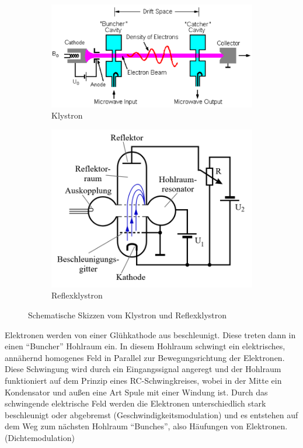 \begin{figure}
    \centering
    \begin{subfigure}{0.45\textwidth}
        \centering
        \includegraphics[width=\textwidth]{images/klystron.png}
        \caption{Klystron}
        \label{fig:klystron}
    \end{subfigure}
    \begin{subfigure}{0.45\textwidth}
        \centering
        \includegraphics[width=\textwidth]{images/reflexklystron.png}
        \caption{Reflexklystron}
        \label{fig:reflexklystron}
    \end{subfigure}
    \caption{Schematische Skizzen vom Klystron und Reflexklystron \cite{wiki_klystron}}
    \label{fig:wiki_klystron}
\end{figure}

Elektronen werden von einer Glühkathode aus beschleunigt. 
Diese treten dann in einen \enquote{Buncher} Hohlraum ein.
In diesem Hohlraum schwingt ein elektrisches, annähernd homogenes Feld in Parallel zur Bewegungsrichtung der Elektronen.
Diese Schwingung wird durch ein Eingangssignal angeregt und der Hohlraum funktioniert auf dem Prinzip eines RC-Schwingkreises,
wobei in der Mitte ein Kondensator und außen eine Art Spule mit einer Windung ist.
Durch das schwingende elektrische Feld werden die Elektronen unterschiedlich stark beschleunigt oder abgebremst (Geschwindigkeitsmodulation)
und es entstehen auf dem Weg zum nächsten Hohlraum \enquote{Bunches}, also Häufungen von Elektronen. (Dichtemodulation)

